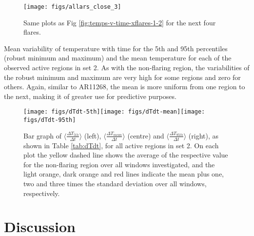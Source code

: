 \documentclass{article}
\begin{document}
\begin{figure}
\begin{centering}
\texttt{[image: figs/allars\_close\_3]} 
\par\end{centering}

\caption{Same plots as Fig \ref{fig:temps-v-time-xflares-1-2} for the next four flares.\label{fig:temps-v-time-xflares-1-3}}
\end{figure}

\begin{table}
\caption{Mean variability of temperature with time for the 5th and 95th percentiles (robust minimum and maximum) and the mean temperature for each of the observed active regions in set 2.
As with the non-flaring region, the variabilities of the robust minimum and maximum are very high for some regions and zero for others.
Again, similar to AR11268, the mean is more uniform from one region to the next, making it of greater use for predictive purposes.\label{tab:dTdt}}
\end{table}

\begin{figure}
\begin{centering}
\texttt{[image: figs/dTdt-5th]}\texttt{[image: figs/dTdt-mean]}\texttt{[image: figs/dTdt-95th]}
\par\end{centering}

\caption{Bar graph of $\langle\frac{\Delta T_{5th}}{\Delta t}\rangle$ (left), $\langle\frac{\Delta T_{mean}}{\Delta t}\rangle$ (centre) and $\langle\frac{\Delta T_{95th}}{\Delta t}\rangle$ (right), as shown in Table \ref{tab:dTdt}, for all active regions in set 2.
On each plot the yellow dashed line shows the average of the respective value for the non-flaring region over all windows investigated, and the light orange, dark orange and red lines indicate the mean plus one, two and three times the standard deviation over all windows, respectively.\label{fig:Bar-graph-flaring}}
\end{figure}


\section{Discussion}
\end{document}
